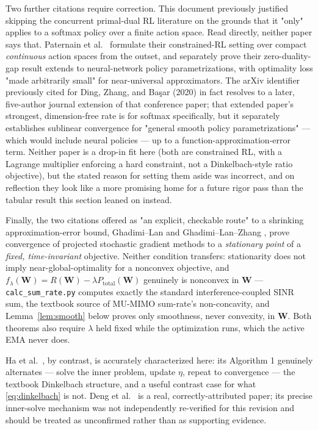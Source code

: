 \documentclass[11pt]{article}
\begin{document}
Two further citations require correction. This document previously
justified skipping the concurrent primal-dual RL literature
\cite{Paternain2019,DingZhangBasar2020} on the grounds that it "only"
applies to a softmax policy over a finite action space. Read directly,
neither paper says that. Paternain et al.\ \cite{Paternain2019} formulate
their constrained-RL setting over compact \emph{continuous} action spaces
from the outset, and separately prove their zero-duality-gap result extends
to neural-network policy parametrizations, with optimality loss "made
arbitrarily small" for near-universal approximators. The arXiv identifier
previously cited for Ding, Zhang, and Ba\c{s}ar (2020) in fact resolves to a
later, five-author journal extension \cite{DingZhangBasar2020} of that
conference paper; that extended paper's strongest, dimension-free rate is
for softmax specifically, but it separately establishes sublinear
convergence for "general smooth policy parametrizations" --- which would
include neural policies --- up to a function-approximation-error term.
Neither paper is a drop-in fit here (both are constrained RL, with a
Lagrange multiplier enforcing a hard constraint, not a Dinkelbach-style
ratio objective), but the stated reason for setting them aside was
incorrect, and on reflection they look like a more promising home for a
future rigor pass than the tabular result this section leaned on instead.

Finally, the two citations offered as "an explicit, checkable route" to a
shrinking approximation-error bound, Ghadimi--Lan \cite{GhadimiLan2013} and
Ghadimi--Lan--Zhang \cite{GhadimiLanZhang2016}, prove convergence of
projected stochastic gradient methods to a \emph{stationary point} of a
\emph{fixed, time-invariant} objective. Neither condition transfers:
stationarity does not imply near-global-optimality for a nonconvex
objective, and $f_\lambda(\mathbf{W})=R(\mathbf{W})-\lambda
P_\text{total}(\mathbf{W})$ genuinely is nonconvex in $\mathbf{W}$ ---
\texttt{calc\_sum\_rate.py} computes exactly the standard interference-coupled
SINR sum, the textbook source of MU-MIMO sum-rate's non-concavity, and
Lemma~\ref{lem:smooth} below proves only smoothness, never convexity, in
$\mathbf{W}$. Both theorems also require $\lambda$ held fixed while the
optimization runs, which the active EMA never does.

Ha et al.\ \cite{HaEtAl2024}, by contrast, is accurately characterized here:
its Algorithm 1 genuinely alternates --- solve the inner problem, update
$\eta$, repeat to convergence --- the textbook Dinkelbach structure, and a
useful contrast case for what \eqref{eq:dinkelbach} is not. Deng et al.\
\cite{DengEtAl2023} is a real, correctly-attributed paper; its precise
inner-solve mechanism was not independently re-verified for this revision
and should be treated as unconfirmed rather than as supporting evidence.
\end{document}
